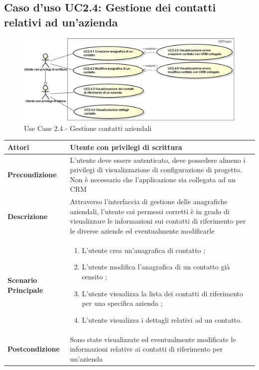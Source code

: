 	\hypertarget{UC2.4}{}
	\subsection{Caso d'uso UC2.4: Gestione dei contatti relativi ad un'azienda}
	\begin{figure}[H]
		\centering
		\includegraphics[scale=0.52]{images/useCase/UC2_4}
		\caption{Use Case 2.4 - Gestione contatti aziendali}
		\label{fig:uc2.4}
	\end{figure}
	\begin{longtable}{ | p{2.7cm} | p{12cm} |}
		\hline \textbf{Attori} & Utente con privilegi di scrittura\\
		\hline \textbf{Precondizione} &  L’utente deve essere autenticato, deve possedere almeno i privilegi di visualizzazione di configurazione di progetto. Non è necessario che l’applicazione sia collegata ad un CRM\\  
		\hline \textbf{Descrizione} & Attraverso l’interfaccia di gestione delle anagrafiche aziendali, l’utente coi permessi corretti è in grado di visualizzare le informazioni sui contatti di riferimento per le diverse aziende ed eventualmente modificarle\\ 
		\hline \textbf{Scenario Principale} & \begin{enumerate}
			\itemsep-0.5em 
			\item L’utente crea un’anagrafica di contatto ;
			\item L’utente modifica l’anagrafica di un contatto già censito ;
			\item L’utente visualizza la lista dei contatti di riferimento per una specifica azienda ;
			\item L’utente visualizza i dettagli relativi ad un contatto.
			
		\end{enumerate}
		\\ 
		\hline \textbf{Postcondizione} & Sono state visualizzate ed eventualmente modificate le informazioni relative ai contatti di riferimento per un’azienda\\ 
		\hline 
	\end{longtable}
	
